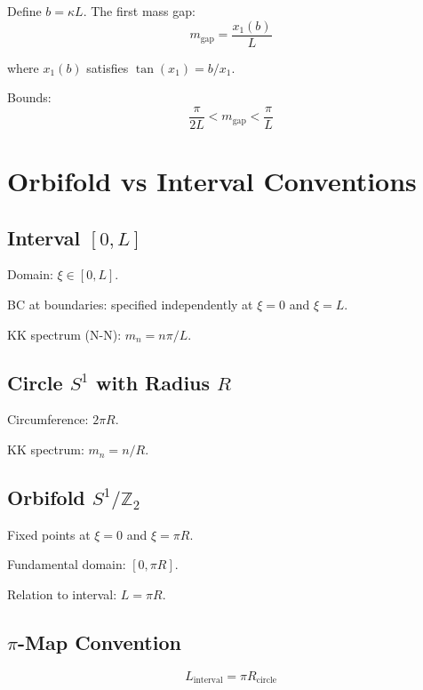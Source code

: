 \documentclass[11pt,a4paper]{article}
\begin{document}
Define $b = \kappa L$. The first mass gap:
\begin{equation}
  m_{\text{gap}} = \frac{x_1(b)}{L}
  \label{eq:app-gap-formula}
\end{equation}

where $x_1(b)$ satisfies $\tan(x_1) = b/x_1$.

Bounds:
\begin{equation}
  \frac{\pi}{2L} < m_{\text{gap}} < \frac{\pi}{L}
  \label{eq:app-gap-bounds}
\end{equation}

\section{Orbifold vs Interval Conventions}
\label{app:conventions}

\subsection{Interval $[0,L]$}

Domain: $\xi \in [0, L]$.

BC at boundaries: specified independently at $\xi=0$ and $\xi=L$.

KK spectrum (N-N): $m_n = n\pi/L$.

\subsection{Circle $S^1$ with Radius $R$}

Circumference: $2\pi R$.

KK spectrum: $m_n = n/R$.

\subsection{Orbifold $S^1/\mathbb{Z}_2$}

Fixed points at $\xi = 0$ and $\xi = \pi R$.

Fundamental domain: $[0, \pi R]$.

Relation to interval: $L = \pi R$.

\subsection{$\pi$-Map Convention}

\begin{equation}
  L_{\text{interval}} = \pi R_{\text{circle}}
  \label{eq:app-pi-map}
\end{equation}
\end{document}
